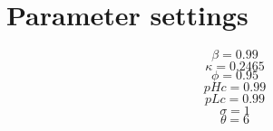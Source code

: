 \section{Parameter settings}

\begin{equation}
\beta = 0.99
\end{equation}
\begin{equation}
\kappa = 0.2465
\end{equation}
\begin{equation}
\phi = 0.95
\end{equation}
\begin{equation}
{p\!H\!c} = 0.99
\end{equation}
\begin{equation}
{p\!L\!c} = 0.99
\end{equation}
\begin{equation}
\sigma = 1
\end{equation}
\begin{equation}
\theta = 6
\end{equation}


